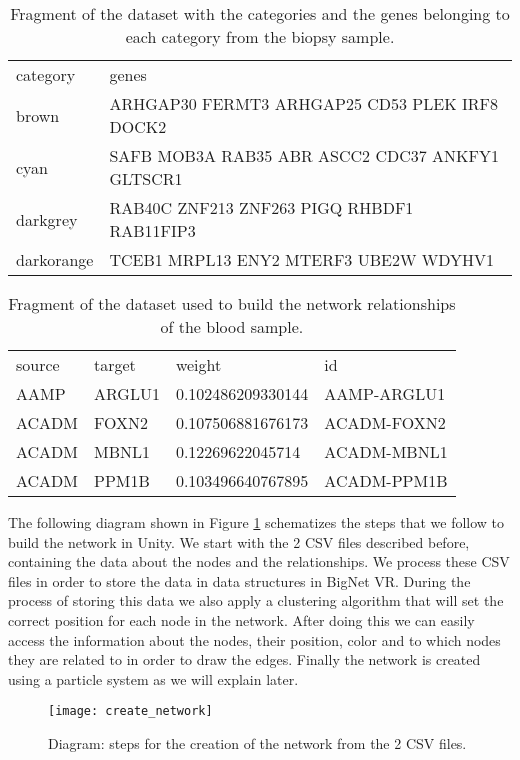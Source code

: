 \begin{table}[h!]
\centering
\begin{tabular}{ll}
\hline
category & genes          \\
brown   & ARHGAP30 FERMT3 ARHGAP25 CD53 PLEK IRF8 DOCK2\\
cyan  & SAFB MOB3A RAB35 ABR ASCC2 CDC37 ANKFY1 GLTSCR1\\
darkgrey  & RAB40C ZNF213 ZNF263 PIGQ RHBDF1 RAB11FIP3\\
darkorange  & TCEB1 MRPL13 ENY2 MTERF3 UBE2W WDYHV1\\
\hline
\end{tabular}
\caption{Fragment of the dataset with the categories and the genes belonging to each category from the biopsy sample.}
\label{tab:categories-data}
\end{table}

\begin{table}[h!]
\centering
\begin{tabular}{llll}
\hline
source & target & weight            & id          \\
AAMP   & ARGLU1 & 0.102486209330144 & AAMP-ARGLU1 \\
ACADM  & FOXN2  & 0.107506881676173 & ACADM-FOXN2 \\
ACADM  & MBNL1  & 0.12269622045714  & ACADM-MBNL1 \\
ACADM  & PPM1B  & 0.103496640767895 & ACADM-PPM1B \\
\hline
\end{tabular}
\caption{Fragment of the dataset used to build the network relationships of the blood sample.}
\label{tab:network-data}
\end{table}

The following diagram shown in Figure \ref{fig:create_network} schematizes the steps that we follow to build the network in Unity. We start with the 2 CSV files described before, containing the data about the nodes and the relationships. We process these CSV files in order to store the data in data structures in BigNet VR. During the process of storing this data we also apply a clustering algorithm that will set the correct position for each node in the network. After doing this we can easily access the information about the nodes, their position, color and to which nodes they are related to in order to draw the edges. Finally the network is created using a particle system as we will explain later.

\begin{figure}[h!]
    \centering%
    \texttt{[image: create\_network]}
    \caption{Diagram: steps for the creation of the network from the 2 CSV files.}
    \label{fig:create_network}
\end{figure}%

